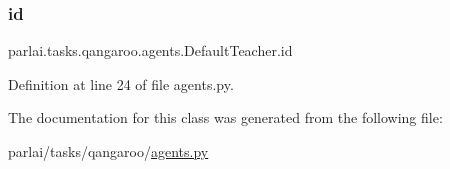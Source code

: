 \subsubsection{\texorpdfstring{id}{id}}
{\footnotesize\ttfamily parlai.\+tasks.\+qangaroo.\+agents.\+Default\+Teacher.\+id}



Definition at line 24 of file agents.\+py.



The documentation for this class was generated from the following file\+:\begin{DoxyCompactItemize}
\item 
parlai/tasks/qangaroo/\hyperlink{parlai_2tasks_2qangaroo_2agents_8py}{agents.\+py}\end{DoxyCompactItemize}

